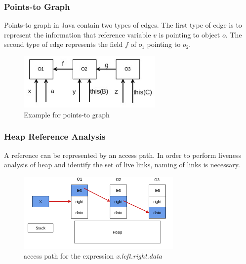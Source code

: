 \documentclass{beamer}
\begin{document}
  \begin{frame}
  \frametitle{Points-to Graph}
	Points-to graph in Java contain two types of edges. The first type of edge is to represent the information that reference variable $v$  is pointing to object $o$. The second type of edge represents the field $f$ of $o_1$ pointing to $o_2$.

	\begin{figure}[here]
		\begin{center}
			\includegraphics[width=7cm]{Figures/rsz_points_to_graph.png}
		\end{center}
		\caption{Example for points-to graph}
		\label{fig:ex1}
	\end{figure}

  \end{frame}

\begin{frame}
\frametitle{Heap Reference Analysis}

A reference can be represented by an access path. In order to perform liveness analysis of heap and identify the set of live links, naming of links is necessary.


	\begin{figure}[here]
		\begin{center}
			\includegraphics[width=8cm]{Figures/hra_access_path.png}
		\end{center}
		\caption{access path for the expression \emph{x.left.right.data}}
		\label{fig:accpath}
	\end{figure}

\end{frame}
\end{document}
